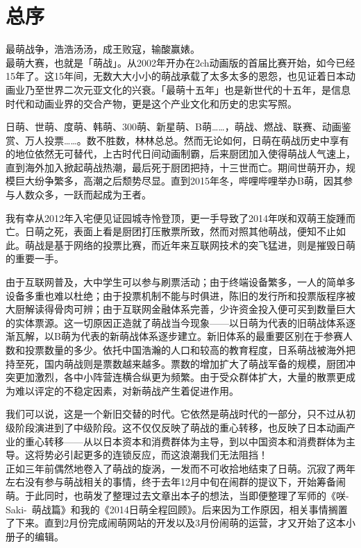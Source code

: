 \chapter*{总序}

最萌战争，浩浩汤汤，成王败寇，输酸赢婊。
\\

最萌大赛，也就是「萌战」。从2002年开办在2ch动画版的首届比赛开始，如今已经15年了。这15年间，无数大大小小的萌战承载了太多太多的恩怨，也见证着日本动画业乃至世界二次元亚文化的兴衰。「最萌十五年」也是新世代的十五年，是信息时代和动画业界的交合产物，更是这个产业文化和历史的忠实写照。

日萌、世萌、度萌、韩萌、300萌、新星萌、B萌……，萌战、燃战、联赛、动画鉴赏、万人投票……。数不胜数，林林总总。然而无论如何，日萌在萌战历史中享有的地位依然无可替代，上古时代日间动画制霸，后来厨团加入使得萌战人气速上，直到海外加入掀起萌战热潮，最后死于厨团把持，十三世而亡。期间世萌开办，规模巨大纷争繁多，高潮之后颓势尽显。直到2015年冬，哔哩哔哩举办B萌，因其参与人数众多，一跃而起成为王者。

我有幸从2012年入宅便见证园城寺怜登顶，更一手导致了2014年咲和双萌王旋踵而亡。日萌之死，表面上看是厨团打压散票所致，然而对照其他萌战，便知不止如此。萌战是基于网络的投票比赛，而近年来互联网技术的突飞猛进，则是摧毁日萌的重要一手。

由于互联网普及，大中学生可以参与刷票活动；由于终端设备繁多，一人的简单多设备多重也难以杜绝；由于投票机制不能与时俱进，陈旧的发行所和投票版程序被大厨解读得骨肉可辨；由于互联网金融体系完善，少许资金投入便可买到数量巨大的实体票源。这一切原因正造就了萌战当今现象——以日萌为代表的旧萌战体系逐渐瓦解，以B萌为代表的新萌战体系逐步建立。新旧体系的最重要区别在于参赛人数和投票数量的多少。依托中国浩瀚的人口和较高的教育程度，日系萌战被海外把持至死，国内萌战则是票数越来越多。票数的增加扩大了萌战军备的规模，厨团冲突更加激烈，各中小阵营连横合纵更为频繁。由于受众群体扩大，大量的散票更成为难以评定的不稳定因素，对新萌战产生着促进作用。

我们可以说，这是一个新旧交替的时代。它依然是萌战时代的一部分，只不过从初级阶段演进到了中级阶段。这不仅仅反映了萌战的重心转移，也反映了日本动画产业的重心转移——从以日本资本和消费群体为主导，到以中国资本和消费群体为主导。这将势必引起更多的连锁反应，而这浪潮我们无法阻挡！
\\

正如三年前偶然地卷入了萌战的旋涡，一发而不可收拾地结束了日萌。沉寂了两年左右没有参与萌战相关的事情，终于去年12月中旬在闹群的提议下，开始筹备闹萌。于此同时，也萌发了整理过去文章出本子的想法，当即便整理了军师的《咲-Saki-~萌战篇》和我的《2014日萌全程回顾》。后来因为工作原因，相关事情搁置了下来。直到2月份完成闹萌网站的开发以及3月份闹萌的运营，才又开始了这本小册子的编辑。

